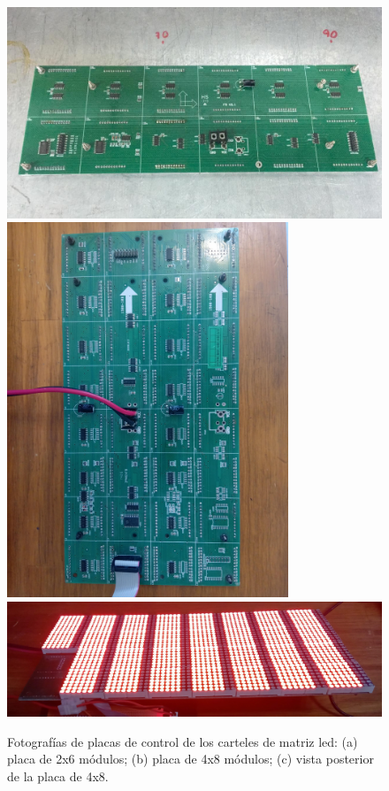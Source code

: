 \begin{figure}[ht]
	\centering
	\includegraphics[width=1\textwidth]{./Figures/cartel2x6.jpeg}
	\includegraphics[width=0.75\textwidth, angle=270]{./Figures/cartel4x8.jpg}\\
	\includegraphics[width=1\textwidth]{./Figures/cartelledON.jpg}\\
	\caption{Fotografías de placas de control de los carteles de matriz led: (a) placa de 2x6 módulos; (b) placa de 4x8 módulos; (c) vista posterior de la placa de 4x8.}
	\label{fig:picsDriverled}
\end{figure}


